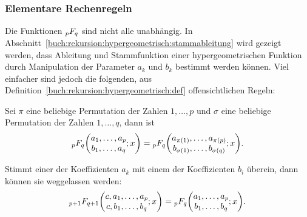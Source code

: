 %
%
\subsubsection{Elementare Rechenregeln}
Die Funktionen $\mathstrut_pF_q$ sind nicht alle unabhängig.
In Abschnitt~\ref{buch:rekursion:hypergeometrisch:stammableitung}
wird gezeigt werden, dass Ableitung und Stammfunktion einer hypergeometrischen
Funktion durch Manipulation der Parameter $a_k$ und $b_k$ bestimmt werden
können.
Viel einfacher sind jedoch die folgenden, aus
Definition~\ref{buch:rekursion:hypergeometrisch:def}
offensichtlichen Regeln:

\begin{satz}[Permutationsregel]
%
\label{buch:rekursion:hypergeometrisch:satz:permuationsregel}
Sei $\pi$ eine beliebige Permutation der Zahlen $1,\dots,p$ und $\sigma$ eine
beliebige Permutation der Zahlen $1,\dots,q$, dann ist 
\begin{equation}
\mathstrut_pF_q\biggl(
\begin{matrix}
a_1,\dots,a_p\\b_1,\dots,a_q
\end{matrix}
;x
\biggr)
=
\mathstrut_pF_q\biggl(
\begin{matrix}
a_{\pi(1)},\dots,a_{\pi(p)}\\b_{\sigma(1)},\dots,b_{\sigma(q)}
\end{matrix}
;x
\biggr).
\label{buch:rekursion:hypergeometrisch:eqn:permuationsregel}
\end{equation}
\end{satz}

\begin{satz}[Kürzungsformel]
%
\label{buch:rekursion:hypergeometrisch:satz:kuerzungsregel}
Stimmt einer der Koeffizienten $a_k$ mit einem der Koeffizienten $b_i$
überein, dann können sie weggelassen werden:
\begin{equation}
\mathstrut_{p+1}F_{q+1}\biggl(
\begin{matrix}
c,a_1,\dots,a_p\\
c,b_1,\dots,b_q
\end{matrix};
x
\biggr)
=
\mathstrut_{p}F_{q}\biggl(
\begin{matrix}
a_1,\dots,a_p\\
b_1,\dots,b_q
\end{matrix};
x
\biggr).
\label{buch:rekursion:hypergeometrisch:eqn:kuerzungsregel}
\end{equation}
\end{satz}

